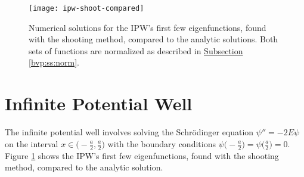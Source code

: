 \documentclass[11pt, a4paper]{article}
\newcommand{\schro}{Schr\"{o}dinger\xspace}
\begin{document}
\begin{figure}[htb!]
\centering
\texttt{[image: ipw-shoot-compared]}
\caption{Numerical solutions for the IPW's first few eigenfunctions, found with the shooting method, compared to the analytic solutions. Both sets of functions are normalized as described in \hyperref[bvp:ss:norm]{Subsection \ref{bvp:ss:norm}}.}
\label{bvp:fig:ivp-shoot-compared}
\end{figure}

\section{Infinite Potential Well}
The infinite potential well involves solving the \schro equation $ \psi'' = -2E \psi $ on the interval $ x \in \big(-\frac{a}{2} , \frac{a}{2} \big) $ with the boundary conditions $ \psi\big(-\frac{a}{2} \big) = \psi \big(\frac{a}{2} \big) = 0$. Figure \ref{bvp:fig:ivp-shoot-compared} shows the IPW's first few eigenfunctions, found with the shooting method, compared to the analytic solution.
\end{document}
